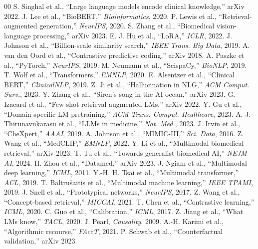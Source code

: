 \documentclass[conference]{IEEEtran}
\begin{document}

\small
\begin{thebibliography}{00}
 S. Singhal et al., ``Large language models encode clinical knowledge,'' arXiv 2022.
 J. Lee et al., ``BioBERT,'' \textit{Bioinformatics}, 2020.
 P. Lewis et al., ``Retrieval-augmented generation,'' \textit{NeurIPS}, 2020.
 S. Zhang et al., ``Biomedical vision-language processing,'' arXiv 2023.
 E. J. Hu et al., ``LoRA,'' \textit{ICLR}, 2022.
 J. Johnson et al., ``Billion-scale similarity search,'' \textit{IEEE Trans. Big Data}, 2019.
 A. van den Oord et al., ``Contrastive predictive coding,'' arXiv 2018.
 A. Paszke et al., ``PyTorch,'' \textit{NeurIPS}, 2019.
 M. Neumann et al., ``ScispaCy,'' \textit{BioNLP}, 2019.
 T. Wolf et al., ``Transformers,'' \textit{EMNLP}, 2020.
 E. Alsentzer et al., ``Clinical BERT,'' \textit{ClinicalNLP}, 2019.
 Z. Ji et al., ``Hallucination in NLG,'' \textit{ACM Comput. Surv.}, 2023.
 Y. Zhang et al., ``Siren's song in the AI ocean,'' arXiv 2023.
 G. Izacard et al., ``Few-shot retrieval augmented LMs,'' arXiv 2022.
 Y. Gu et al., ``Domain-specific LM pretraining,'' \textit{ACM Trans. Comput. Healthcare}, 2023.
 A. J. Thirunavukarasu et al., ``LLMs in medicine,'' \textit{Nat. Med.}, 2023.
 J. Irvin et al., ``CheXpert,'' \textit{AAAI}, 2019.
 A. Johnson et al., ``MIMIC-III,'' \textit{Sci. Data}, 2016.
 Z. Wang et al., ``MedCLIP,'' \textit{EMNLP}, 2022.
 Y. Li et al., ``Multimodal biomedical retrieval,'' arXiv 2023.
 T. Tu et al., ``Towards generalist biomedical AI,'' \textit{NEJM AI}, 2024.
 H. Zhou et al., ``Datamed,'' arXiv 2023.
 J. Ngiam et al., ``Multimodal deep learning,'' \textit{ICML}, 2011.
 Y.-H. H. Tsai et al., ``Multimodal transformer,'' \textit{ACL}, 2019.
 T. Baltrušaitis et al., ``Multimodal machine learning,'' \textit{IEEE TPAMI}, 2019.
 J. Snell et al., ``Prototypical networks,'' \textit{NeurIPS}, 2017.
 Z. Wang et al., ``Concept-based retrieval,'' \textit{MICCAI}, 2021.
 T. Chen et al., ``Contrastive learning,'' \textit{ICML}, 2020.
 C. Guo et al., ``Calibration,'' \textit{ICML}, 2017.
 Z. Jiang et al., ``What LMs know,'' \textit{TACL}, 2020.
 J. Pearl, \textit{Causality}. 2009.
 A.-H. Karimi et al., ``Algorithmic recourse,'' \textit{FAccT}, 2021.
 P. Schwab et al., ``Counterfactual validation,'' arXiv 2023.
\end{thebibliography}
\end{document}

